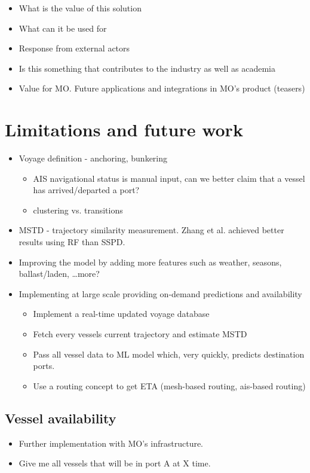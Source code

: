 \begin{itemize}
    \item What is the value of this solution
    \item What can it be used for
    \item Response from external actors
    \item Is this something that contributes to the industry as well as academia
    \item Value for MO\@. Future applications and integrations in MO's product (teasers)
\end{itemize}

\section{Limitations and future work}

\begin{itemize}
    \item Voyage definition - anchoring, bunkering
\begin{itemize}
    \item AIS navigational status is manual input, can we better claim that a vessel has arrived/departed a port?
    \item clustering vs. transitions
\end{itemize}
    \item MSTD - trajectory similarity measurement. Zhang et al. achieved better results using RF than SSPD.
    \item Improving the model by adding more features such as weather, seasons, ballast/laden, \ldots more?
    \item Implementing at large scale providing on-demand predictions and availability
\begin{itemize}
    \item Implement a real-time updated voyage database
    \item Fetch every vessels current trajectory and estimate MSTD
    \item Pass all vessel data to ML model which, very quickly, predicts destination ports.
    \item Use a routing concept to get ETA (mesh-based routing, ais-based routing)
\end{itemize}
\end{itemize}

\subsection{Vessel availability}
\begin{itemize}
    \item Further implementation with MO's infrastructure.
    \item Give me all vessels that will be in port A at X time.
\end{itemize}
